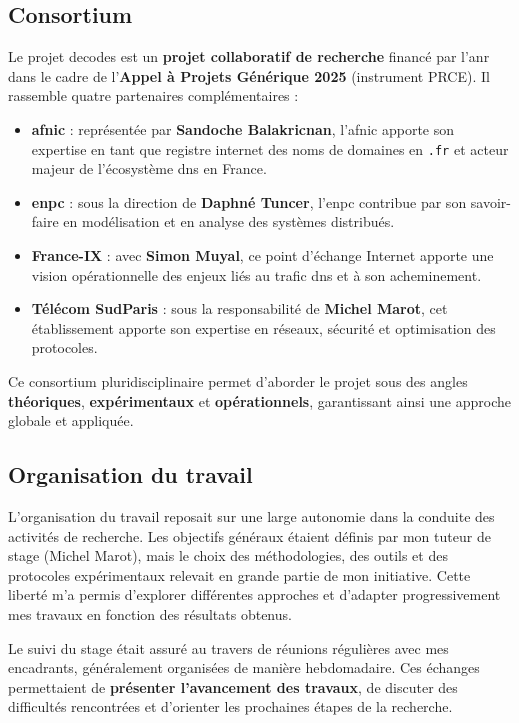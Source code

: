 \documentclass[12pt, a4paper]{report}
\begin{document}
	\subsection{Consortium}
	Le projet \gls{decodes} est un \textbf{projet collaboratif de recherche} financé par l'\gls{anr} dans le cadre de l'\textbf{Appel à Projets Générique 2025} (instrument PRCE). Il rassemble quatre partenaires complémentaires :

	\begin{itemize}
		\item \textbf{\gls{afnic}} : représentée par \textbf{Sandoche Balakricnan}, l'\gls{afnic} apporte son expertise en tant que registre internet des noms de domaines en \texttt{.fr} et acteur majeur de l'écosystème \gls{dns} en France.
		\item \textbf{\gls{enpc}} : sous la direction de \textbf{Daphné Tuncer}, l'\gls{enpc} contribue par son savoir-faire en modélisation et en analyse des systèmes distribués.
		\item \textbf{France-IX} : avec \textbf{Simon Muyal}, ce point d'échange Internet apporte une vision opérationnelle des enjeux liés au trafic \gls{dns} et à son acheminement.
		\item \textbf{Télécom SudParis} : sous la responsabilité de \textbf{Michel Marot}, cet établissement apporte son expertise en réseaux, sécurité et optimisation des protocoles.
	\end{itemize}

	Ce consortium pluridisciplinaire permet d'aborder le projet sous des angles \textbf{théoriques}, \textbf{expérimentaux} et \textbf{opérationnels}, garantissant ainsi une approche globale et appliquée.

	\subsection{Organisation du travail}

	L'organisation du travail reposait sur une large autonomie dans la conduite des activités de recherche. Les objectifs généraux étaient définis par mon tuteur de stage (Michel Marot), mais le choix des méthodologies, des outils et des protocoles expérimentaux relevait en grande partie de mon initiative. Cette liberté m'a permis d'explorer différentes approches et d'adapter progressivement mes travaux en fonction des résultats obtenus.

	Le suivi du stage était assuré au travers de réunions régulières avec mes encadrants, généralement organisées de manière hebdomadaire. Ces échanges permettaient de \textbf{présenter l'avancement des travaux}, de discuter des difficultés rencontrées et d'orienter les prochaines étapes de la recherche.
\end{document}
